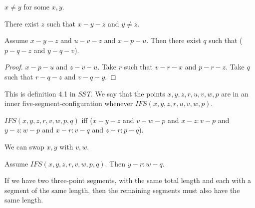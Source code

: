 \documentclass{article}
\begin{document}
  \begin{forthel}
    \begin{lemma}[L3o13]
      $x \neq y$ for some $x, y$.
    \end{lemma}

    \begin{lemma}[L3o14]
      There exist $z$ such that $x-y-z$ and $y \neq z$.
    \end{lemma}

    \begin{lemma}[L3o17]
      Assume $x-y-z$ and $u-v-z$ and $x-p-u$. Then there exist $q$ such that ($p-q-z$ and $y-q-v$).
    \end{lemma}
    \begin{proof}
      $x-p-u$ and $z-v-u$.
    	Take $r$ such that $v-r-x$ and $p-r-z$. %
    	Take $q$ such that $r-q-z$ and $v-q-y$. %
    \end{proof}
  \end{forthel}


  This is definition 4.1 in \textit{SST}.
  We say that the points $x,y,z,r,u,v,w,p$ are
  in an inner five-segment-configuration
  whenever $IFS(x,y,z,r,u,v,w,p)$.

  \begin{forthel}
    \begin{definition}[IFS]
      $IFS(x,y,z,r,v,w,p,q)$ iff ($x-y-z$ and $v-w-p$ and $x-z : v-p$ and $y-z : w-p$ and $x-r : v-q$ and $z-r : p-q$).
    \end{definition}
  \end{forthel}

  We can swap $x, y$ with $v, w$.

  \begin{forthel}
    \begin{axiom}[L4o2]
      Assume $IFS(x,y,z,r,v,w,p,q)$. Then $y-r : w-q$.
    \end{axiom}
  \end{forthel}

  If we have two three-point segments, with the same total length and each with a segment of the same length, then the remaining segments must also have the same length.

\end{document}

